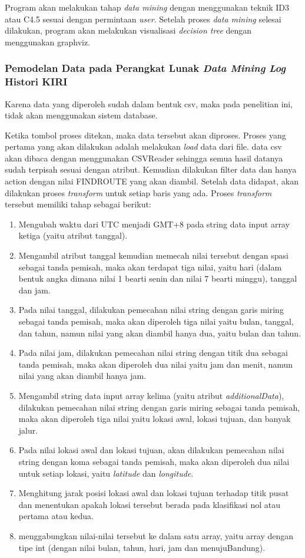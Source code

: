 Program akan melakukan tahap \textsl{data mining} dengan menggunakan teknik ID3 atau C4.5 sesuai dengan permintaan \textsl{user}. Setelah proses \textsl{data mining} selesai dilakukan, program akan melakukan visualisasi \textsl{decision tree} dengan menggunakan graphviz.  

\subsubsection{Pemodelan Data pada Perangkat Lunak \textsl{Data Mining Log} Histori KIRI}
Karena data yang diperoleh sudah dalam bentuk csv, maka pada penelitian ini, tidak akan menggunakan sistem database. 

Ketika tombol proses ditekan, maka data tersebut akan diproses. Proses yang pertama yang akan dilakukan adalah melakukan \textsl{load} data dari file. data csv akan dibaca dengan menggunakan CSVReader sehingga semua hasil datanya sudah terpisah sesuai dengan atribut. Kemudian dilakukan filter data dan hanya action dengan nilai FINDROUTE yang akan diambil. Setelah data didapat, akan dilakukan proses \textsl{transform} untuk setiap baris yang ada. Proses \textsl{transform} tersebut memiliki tahap sebagai berikut:
\begin{enumerate}
	\item Mengubah waktu dari UTC menjadi GMT+8 pada string data input array ketiga (yaitu atribut tanggal).
	\item Mengambil atribut tanggal kemudian memecah nilai tersebut dengan spasi sebagai tanda pemisah, maka akan terdapat tiga nilai, yaitu hari (dalam bentuk angka dimana nilai 1 bearti senin dan nilai 7 bearti minggu), tanggal dan jam.
	\item Pada nilai tanggal, dilakukan pemecahan nilai string dengan garis miring sebagai tanda pemisah, maka akan diperoleh tiga nilai yaitu bulan, tanggal, dan tahun, namun nilai yang akan diambil hanya dua, yaitu bulan dan tahun.
	\item Pada nilai jam, dilakukan pemecahan nilai string dengan titik dua sebagai tanda pemisah, maka akan diperoleh dua nilai yaitu jam dan menit, namun nilai yang akan diambil hanya jam.
	\item Mengambil string data input array kelima (yaitu atribut \textsl{additionalData}), dilakukan pemecahan nilai string dengan garis miring sebagai tanda pemisah, maka akan diperoleh tiga nilai yaitu lokasi awal, lokasi tujuan, dan banyak jalur.
	\item Pada nilai lokasi awal dan lokasi tujuan, akan dilakukan pemecahan nilai string dengan koma sebagai tanda pemisah, maka akan diperoleh dua nilai untuk setiap lokasi, yaitu \textsl{latitude} dan \textsl{longitude}.
	\item Menghitung jarak posisi lokasi awal dan lokasi tujuan terhadap titik pusat dan menentukan apakah lokasi tersebut berada pada klasifikasi nol atau pertama atau kedua.
	\item menggabungkan nilai-nilai tersebut ke dalam satu array, yaitu array dengan tipe int (dengan nilai bulan, tahun, hari, jam dan menujuBandung).
\end{enumerate}

